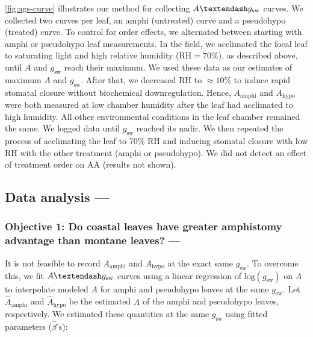 \documentclass[
  letterpaper,
  DIV=11,
  numbers=noendperiod]{scrartcl}
\begin{document}
\autoref{fig:ags-curve} illustrates our method for collecting
\(A \textendash g_\text{sw}\) curves. We collected two curves per leaf,
an amphi (untreated) curve and a pseudohypo (treated) curve. To control
for order effects, we alternated between starting with amphi or
pseudohypo leaf measurements. In the field, we acclimated the focal leaf
to saturating light and high relative humidity (\(\mathrm{RH} = 70\%\)),
as described above, until \(A\) and \(g_\text{sw}\) reach their maximum.
We used these data as our estimates of maximum \(A\) and
\(g_\text{sw}\). After that, we decreased \(\mathrm{RH}\) to
\(\approx 10\%\) to induce rapid stomatal closure without biochemical
downregulation. Hence, \(A_\text{amphi}\) and \(A_\text{hypo}\) were
both measured at low chamber humidity after the leaf had acclimated to
high humidity. All other environmental conditions in the leaf chamber
remained the same. We logged data until \(g_\text{sw}\) reached its
nadir. We then repeated the process of acclimating the leaf to 70\%
\(\mathrm{RH}\) and inducing stomatal closure with low \(\mathrm{RH}\)
with the other treatment (amphi or pseudohypo). We did not detect an
effect of treatment order on \(\mathrm{AA}\) (results not shown).

\hypertarget{data-analyis}{%
\subsection{Data analysis ---}\label{data-analyis}}

\hypertarget{objective-1-do-coastal-leaves-have-greater-amphistomy-advantage-than-montane-leaves}{%
\subsubsection{Objective 1: Do coastal leaves have greater amphistomy
advantage than montane leaves?
---}\label{objective-1-do-coastal-leaves-have-greater-amphistomy-advantage-than-montane-leaves}}

It is not feasible to record \(A_\mathrm{amphi}\) and
\(A_\mathrm{hypo}\) at the exact same \(g_\text{sw}\). To overcome this,
we fit \(A \textendash g_\text{sw}\) curves using a linear regression of
\(\text{log}(g_\mathrm{sw})\) on \(A\) to interpolate modeled \(A\) for
amphi and pseudohypo leaves at the same \(g_\text{sw}\). Let
\(\hat{A}_\text{amphi}\) and \(\hat{A}_\text{hypo}\) be the estimated
\(A\) of the amphi and pseudohypo leaves, respectively. We estimated
these quantities at the same \(g_\mathrm{sw}\) using fitted parameters
(\(\hat{\beta}\)'s):
\end{document}
